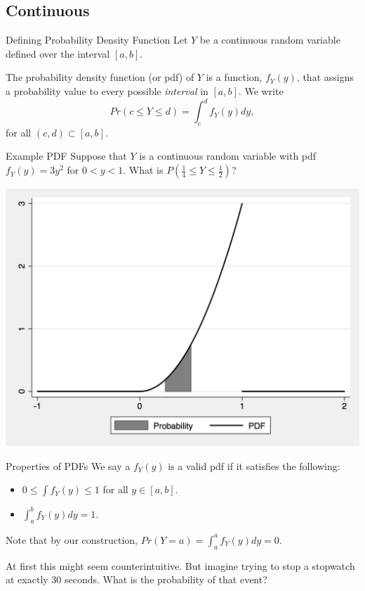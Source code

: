 \documentclass{beamer}
\begin{document}
\subsection{Continuous}
\begin{frame}{Defining Probability Density Function}
	Let $Y$ be a continuous random variable defined over the interval $[a,b]$.
		
	\begin{definition}\vspace{2.5mm}
		The \alert{probability density function} (or pdf) of $Y$ is a function, $f_Y(y)$, that assigns a probability value to every possible \textit{interval} in $[a,b]$. We write
		\[ Pr(c\leqslant Y\leqslant d) = \int_{c}^{d}f_Y(y) dy, \]
		for all $(c,d)\subset [a,b]$.
	\end{definition}
\end{frame}
	

\begin{frame}{Example PDF}
	Suppose that $Y$ is a continuous random variable with pdf $f_Y(y) = 3y^2$ for $0<y<1$. What is $P(\frac{1}{4} \leqslant Y \leqslant \frac{1}{2})$?
				
	\centering\includegraphics[width=.6\textwidth]{pdfwprob.png}
\end{frame}

\begin{frame}{Properties of PDFs}
	We say a $f_Y(y)$ is a \alert{valid} pdf if it satisfies the following:
			
	\begin{itemize}
		\item $0\leqslant \int f_Y(y) \leqslant 1$ for all $y \in [a,b]$.
		\item $\displaystyle\int_{a}^b f_Y(y)dy = 1.$
	\end{itemize}
			
	Note that by our construction, $Pr(Y=a) = \displaystyle\int_{a}^a f_Y(y)dy = 0$. 
		
	At first this might seem counterintuitive. But imagine trying to stop a stopwatch at exactly 30 seconds. What is the probability of that event?
\end{frame}
\end{document}
